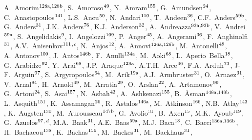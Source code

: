 \begin{flushleft}
A.~Amorim$^\textrm{\scriptsize 128a,128b}$,
S.~Amoroso$^\textrm{\scriptsize 49}$,
N.~Amram$^\textrm{\scriptsize 155}$,
G.~Amundsen$^\textrm{\scriptsize 24}$,
C.~Anastopoulos$^\textrm{\scriptsize 141}$,
L.S.~Ancu$^\textrm{\scriptsize 50}$,
N.~Andari$^\textrm{\scriptsize 110}$,
T.~Andeen$^\textrm{\scriptsize 36}$,
C.F.~Anders$^\textrm{\scriptsize 59b}$,
G.~Anders$^\textrm{\scriptsize 31}$,
J.K.~Anders$^\textrm{\scriptsize 76}$,
K.J.~Anderson$^\textrm{\scriptsize 32}$,
A.~Andreazza$^\textrm{\scriptsize 93a,93b}$,
V.~Andrei$^\textrm{\scriptsize 59a}$,
S.~Angelidakis$^\textrm{\scriptsize 9}$,
I.~Angelozzi$^\textrm{\scriptsize 109}$,
P.~Anger$^\textrm{\scriptsize 45}$,
A.~Angerami$^\textrm{\scriptsize 36}$,
F.~Anghinolfi$^\textrm{\scriptsize 31}$,
A.V.~Anisenkov$^\textrm{\scriptsize 111}$$^{,c}$,
N.~Anjos$^\textrm{\scriptsize 12}$,
A.~Annovi$^\textrm{\scriptsize 126a,126b}$,
M.~Antonelli$^\textrm{\scriptsize 48}$,
A.~Antonov$^\textrm{\scriptsize 100}$,
J.~Antos$^\textrm{\scriptsize 146b}$,
F.~Anulli$^\textrm{\scriptsize 134a}$,
M.~Aoki$^\textrm{\scriptsize 68}$,
L.~Aperio~Bella$^\textrm{\scriptsize 18}$,
G.~Arabidze$^\textrm{\scriptsize 92}$,
Y.~Arai$^\textrm{\scriptsize 68}$,
J.P.~Araque$^\textrm{\scriptsize 128a}$,
A.T.H.~Arce$^\textrm{\scriptsize 46}$,
F.A.~Arduh$^\textrm{\scriptsize 73}$,
J-F.~Arguin$^\textrm{\scriptsize 97}$,
S.~Argyropoulos$^\textrm{\scriptsize 64}$,
M.~Arik$^\textrm{\scriptsize 19a}$,
A.J.~Armbruster$^\textrm{\scriptsize 31}$,
O.~Arnaez$^\textrm{\scriptsize 31}$,
V.~Arnal$^\textrm{\scriptsize 84}$,
H.~Arnold$^\textrm{\scriptsize 49}$,
M.~Arratia$^\textrm{\scriptsize 29}$,
O.~Arslan$^\textrm{\scriptsize 22}$,
A.~Artamonov$^\textrm{\scriptsize 99}$,
G.~Artoni$^\textrm{\scriptsize 24}$,
S.~Asai$^\textrm{\scriptsize 157}$,
N.~Asbah$^\textrm{\scriptsize 43}$,
A.~Ashkenazi$^\textrm{\scriptsize 155}$,
B.~{\AA}sman$^\textrm{\scriptsize 148a,148b}$,
L.~Asquith$^\textrm{\scriptsize 151}$,
K.~Assamagan$^\textrm{\scriptsize 26}$,
R.~Astalos$^\textrm{\scriptsize 146a}$,
M.~Atkinson$^\textrm{\scriptsize 166}$,
N.B.~Atlay$^\textrm{\scriptsize 143}$,
K.~Augsten$^\textrm{\scriptsize 130}$,
M.~Aurousseau$^\textrm{\scriptsize 147b}$,
G.~Avolio$^\textrm{\scriptsize 31}$,
B.~Axen$^\textrm{\scriptsize 15}$,
M.K.~Ayoub$^\textrm{\scriptsize 119}$,
G.~Azuelos$^\textrm{\scriptsize 97}$$^{,d}$,
M.A.~Baak$^\textrm{\scriptsize 31}$,
A.E.~Baas$^\textrm{\scriptsize 59a}$,
M.J.~Baca$^\textrm{\scriptsize 18}$,
C.~Bacci$^\textrm{\scriptsize 136a,136b}$,
H.~Bachacou$^\textrm{\scriptsize 138}$,
K.~Bachas$^\textrm{\scriptsize 156}$,
M.~Backes$^\textrm{\scriptsize 31}$,
M.~Backhaus$^\textrm{\scriptsize 31}$,

\end{flushleft}

